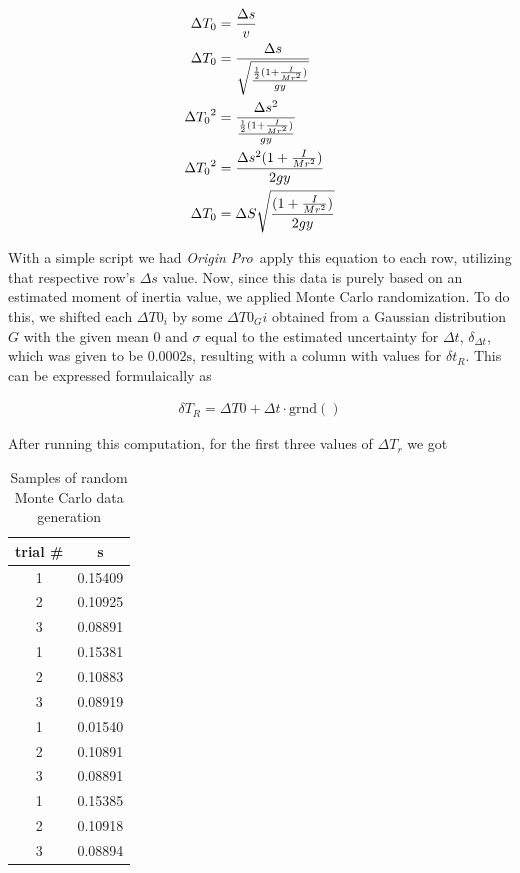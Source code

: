 \documentclass[coverpage]{article}
\newcommand{\softwareText}[1]{\textit{#1}\texttrademark}
\newcommand{\origin}{\softwareText{Origin Pro}}
\begin{document}
	\begin{align}
		\Delta{T_0}&= \frac{\Delta{s}}{v} \notag \\
		\Delta{T_0}&= \frac{\Delta{s}}{\sqrt{\frac{\frac{1}{2}(1 + \frac{I}{Mr^2})}{gy}}} \notag \\
		\Delta{T_0}^2&= \frac{\Delta{s}^2}{\frac{\frac{1}{2}(1 + \frac{I}{Mr^2})}{gy}} \notag \\
		\Delta{T_0}^2&= \frac{\Delta{s}^2 (1 + \frac{I}{M r^2})}{2gy} \notag \\
		\Delta{T_0}&= \Delta{S} \sqrt{\frac{(1 + \frac{I}{M r^2})}{2gy}}
	\end{align}

	With a simple script we had \origin~apply this equation to each row, utilizing that respective row's $\Delta{s}$ value. Now, since this data is purely based on an estimated moment of inertia value, we applied Monte Carlo randomization. To do this, we shifted each $\Delta{T0_i}$ by some $\Delta{T0_Gi}$ obtained from a Gaussian distribution $G$ with the given mean $0$ and $\sigma$ equal to the estimated uncertainty for $\Delta{t}$, $\delta_{\Delta{t}}$, which was given to be $0.0002 \text{s}$, resulting with a column with values for $\delta{t_R}$. This can be expressed formulaically as
	
	\begin{align}
		\delta{T_R} = \Delta{T0} + \Delta{t} \cdot \text{grnd}()
	\end{align}

	After running this computation, for the first three values of $\Delta{T_r}$ we got

	\begin{table}[h]
		\centering
		\caption{Samples of random Monte Carlo data generation}
		\begin{tabular}{c|c}
			trial \# & s \\ \hline
			1 & 0.15409 \\
			2 & 0.10925 \\
			3 & 0.08891 \\ \hline
			1 & 0.15381 \\
			2 & 0.10883 \\
			3 & 0.08919 \\ \hline
			1 & 0.01540 \\
			2 & 0.10891 \\
			3 & 0.08891 \\ \hline
			1 & 0.15385 \\
			2 & 0.10918 \\
			3 & 0.08894 \\
		\end{tabular}
	\end{table}
	
\end{document}
